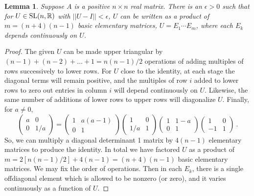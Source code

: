 \documentclass{amsart}
\newtheorem{lemma}[theorem]{Lemma}
\theoremstyle{definition}
\theoremstyle{remark}
\numberwithin{equation}{section}
\begin{document}
{{\begin{lemma} \label{factorize} 
Suppose $A$ is a positive $n\times n$ real matrix. 
There is an $\epsilon >0$ 
such that for $U\in \textnormal{SL}(n,\mathbb R)$ with $||U-I||< \epsilon $, 
$U$ can be written as a product of $m=(n+4)(n-1)$ basic elementary matrices,  
$U=E_1 \cdots E_{m}$, where each $E_k$ depends continuously on $U$. 

\end{lemma} 

\begin{proof} 
The given $U$ can be made upper triangular by 
$(n-1) + (n-2) + \dots +1=n(n-1)/2$ operations of 
adding multiples of rows successively to lower rows. For $U$ close to the identity, 
at each stage the diagonal terms will remain positive, and the multiples 
of row $i$ added to lower rows to zero out entries in column $i$ will depend 
continuously on $U$. Likewise, 
the same number of additions of 
lower rows to upper rows will diagonalize $U$.
  Finally, for $a\neq 0$, 
\[ 
\begin{pmatrix} 
a & 0 \\ 0 & 1/a 
\end{pmatrix} 
= 
\begin{pmatrix} 
1 & a(a-1)\\ 0 & 1 
\end{pmatrix} 
\begin{pmatrix} 
1 & 0 \\ 1/a & 1 
\end{pmatrix} 
\begin{pmatrix} 
1 & 1-a \\ 0 & 1
\end{pmatrix} 
\begin{pmatrix} 
1 & 0 \\ -1 & 1
\end{pmatrix} \ . 
\] 
So, we can  multiply a diagonal 
determinant 1 matrix by  
$4(n-1)$ elementary matrices 
to produce the identity. In total we have factored $U$ 
as a product of  $m=2[n(n-1)/2] + 4(n-1) = (n+4)(n-1) $ 
basic elementary matrices. We may fix the order of operations.  
 Then in each  
$E_k$, there is a single offdiagonal element which is allowed 
to be nonzero (or zero), and it varies continuously as a 
function of $U$. 
\end{proof} 

}}
\end{document}
